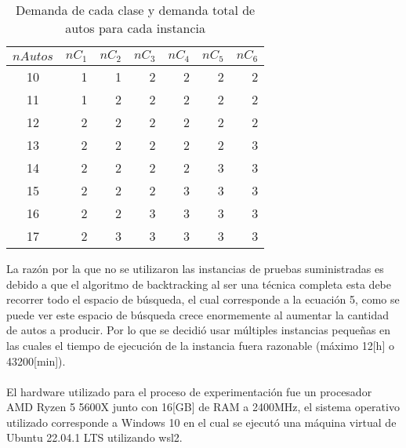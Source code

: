 \documentclass[letter, 10pt]{article}
\begin{document}
\begin{table}[H]
\centering
\begin{tabular}{|c|r|r|r|r|r|r|}
\hline
$nAutos$ & \multicolumn{1}{c|}{$nC_1$} & \multicolumn{1}{c|}{$nC_2$} & \multicolumn{1}{c|}{$nC_3$} & \multicolumn{1}{c|}{$nC_4$} & \multicolumn{1}{c|}{$nC_5$} & \multicolumn{1}{c|}{$nC_6$} \\ \hline
10     & 1                        & 1                        & 2                        & 2                        & 2                        & 2                        \\ \hline
11     & 1                        & 2                        & 2                        & 2                        & 2                        & 2                        \\ \hline
12     & 2                        & 2                        & 2                        & 2                        & 2                        & 2                        \\ \hline
13     & 2                        & 2                        & 2                        & 2                        & 2                        & 3                        \\ \hline
14     & 2                        & 2                        & 2                        & 2                        & 3                        & 3                        \\ \hline
15     & 2                        & 2                        & 2                        & 3                        & 3                        & 3                        \\ \hline
16     & 2                        & 2                        & 3                        & 3                        & 3                        & 3                        \\ \hline
17     & 2                        & 3                        & 3                        & 3                        & 3                        & 3                        \\ \hline
\end{tabular}
\caption{Demanda de cada clase y demanda total de autos para cada instancia}
\end{table}
La raz\'on por la que no se utilizaron las instancias de pruebas suministradas es debido a que el algoritmo de backtracking al ser una t\'ecnica completa esta debe recorrer todo el espacio de b\'usqueda, el cual corresponde a la ecuaci\'on 5, como se puede ver este espacio de b\'usqueda crece enormemente al aumentar la cantidad de autos a producir. Por lo que se decidi\'o usar m\'ultiples instancias peque\~{n}as en las cuales el tiempo de ejecuci\'on de la instancia fuera razonable (m\'aximo 12[h] o 43200[min]).\\\\
El hardware utilizado para el proceso de experimentaci\'on fue un procesador AMD Ryzen 5 5600X junto con 16[GB] de RAM a 2400MHz, el sistema operativo utilizado corresponde a Windows 10 en el cual se ejecut\'o una m\'aquina virtual de Ubuntu 22.04.1 LTS utilizando wsl2.
\end{document}
